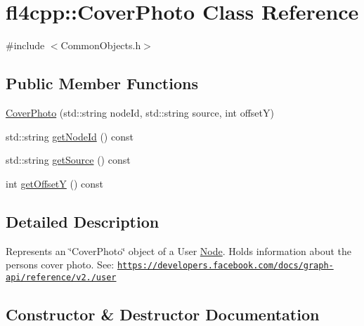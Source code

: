 \hypertarget{classfl4cpp_1_1_cover_photo}{}\section{fl4cpp\+:\+:Cover\+Photo Class Reference}
\label{classfl4cpp_1_1_cover_photo}


{\ttfamily \#include $<$Common\+Objects.\+h$>$}

\subsection*{Public Member Functions}
\begin{DoxyCompactItemize}
\item 
\hyperlink{classfl4cpp_1_1_cover_photo_a0340461d06492030bc421a4868f9ecd4}{Cover\+Photo} (std\+::string node\+Id, std\+::string source, int offsetY)
\item 
std\+::string \hyperlink{classfl4cpp_1_1_cover_photo_a50babe42c5b0b365b20fc676a2921523}{get\+Node\+Id} () const 
\item 
std\+::string \hyperlink{classfl4cpp_1_1_cover_photo_accf39d6167609bbebf6314aad7c92e9f}{get\+Source} () const 
\item 
int \hyperlink{classfl4cpp_1_1_cover_photo_ad29c6748412c11e0eabd31b9035981de}{get\+OffsetY} () const 
\end{DoxyCompactItemize}


\subsection{Detailed Description}
Represents an \char`\"{}\+Cover\+Photo\char`\"{} object of a User \hyperlink{classfl4cpp_1_1_node}{Node}. Holds information about the person\textquotesingle{}s cover photo. See\+: \href{https://developers.facebook.com/docs/graph-api/reference/v2.0/user}{\tt https\+://developers.\+facebook.\+com/docs/graph-\/api/reference/v2./user} 

\subsection{Constructor \& Destructor Documentation}
